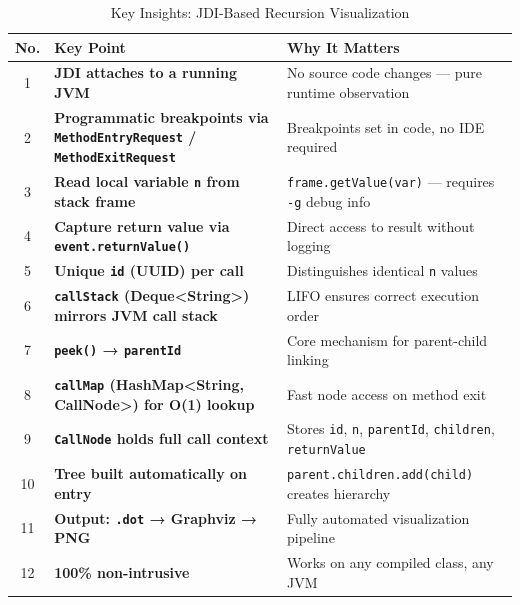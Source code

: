 \documentclass[11pt,a4paper]{article}
\begin{document}
    \begin{table}[H]
        \centering
        \caption{Key Insights: JDI-Based Recursion Visualization}
        \label{tab:key-points}
        \begin{tabular}{|c|p{6.5cm}|p{6.5cm}|}
            \hline
            \textbf{No.} & \textbf{Key Point} & \textbf{Why It Matters} \\
            \hline
            1 & \textbf{JDI attaches to a running JVM} & No source code changes — pure runtime observation \\
            \hline
            2 & \textbf{Programmatic breakpoints via \texttt{MethodEntryRequest} / \texttt{MethodExitRequest}} & Breakpoints set in code, no IDE required \\
            \hline
            3 & \textbf{Read local variable \texttt{n} from stack frame} & \texttt{frame.getValue(var)} — requires \texttt{-g} debug info \\
            \hline
            4 & \textbf{Capture return value via \texttt{event.returnValue()}} & Direct access to result without logging \\
            \hline
            5 & \textbf{Unique \texttt{id} (UUID) per call} & Distinguishes identical \texttt{n} values \\
            \hline
            6 & \textbf{\texttt{callStack} (Deque<String>) mirrors JVM call stack} & LIFO ensures correct execution order \\
            \hline
            7 & \textbf{\texttt{peek()} → \texttt{parentId}} & Core mechanism for parent-child linking \\
            \hline
            8 & \textbf{\texttt{callMap} (HashMap<String, CallNode>) for O(1) lookup} & Fast node access on method exit \\
            \hline
            9 & \textbf{\texttt{CallNode} holds full call context} & Stores \texttt{id}, \texttt{n}, \texttt{parentId}, \texttt{children}, \texttt{returnValue} \\
            \hline
            10 & \textbf{Tree built automatically on entry} & \texttt{parent.children.add(child)} creates hierarchy \\
            \hline
            11 & \textbf{Output: \texttt{.dot} → Graphviz → PNG} & Fully automated visualization pipeline \\
            \hline
            12 & \textbf{100\% non-intrusive} & Works on any compiled class, any JVM \\
            \hline
        \end{tabular}
    \end{table}
\end{document}
